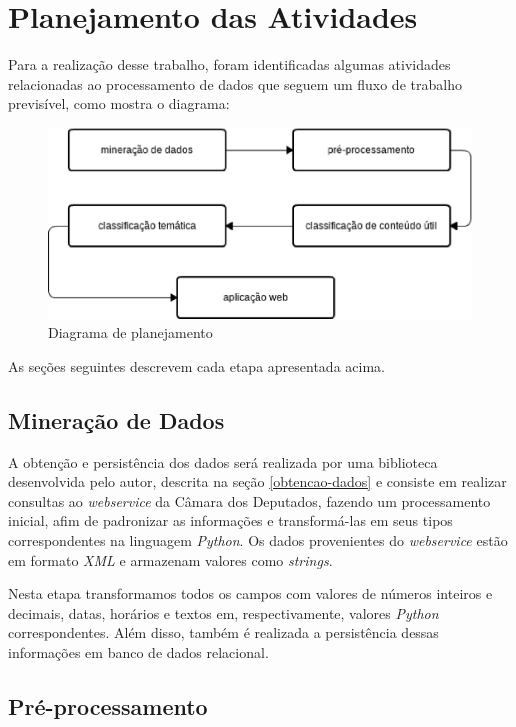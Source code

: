 \section{Planejamento das Atividades}

Para a realização desse trabalho, foram identificadas algumas atividades relacionadas ao processamento de dados que seguem um fluxo de trabalho previsível, como mostra o diagrama:

\begin{figure}[h]
    \centering
    \includegraphics[scale=0.5]{figuras/planejamento.eps}
    \caption{Diagrama de planejamento}
\end{figure}

As seções seguintes descrevem cada etapa apresentada acima.

\subsection{Mineração de Dados}

A obtenção e persistência dos dados será realizada por uma biblioteca desenvolvida pelo autor, descrita na seção \ref{obtencao-dados} e consiste em realizar consultas ao \textit{webservice} da Câmara dos Deputados, fazendo um processamento inicial, afim de padronizar as informações e transformá-las em seus tipos correspondentes na linguagem \textit{Python}. Os dados provenientes do \textit{webservice} estão em formato \textit{XML} e armazenam valores como \textit{strings}.

Nesta etapa transformamos todos os campos com valores de números inteiros e decimais, datas, horários e textos em, respectivamente, valores \textit{Python} correspondentes. Além disso, também é realizada a persistência dessas informações em banco de dados relacional.

\subsection{Pré-processamento}

